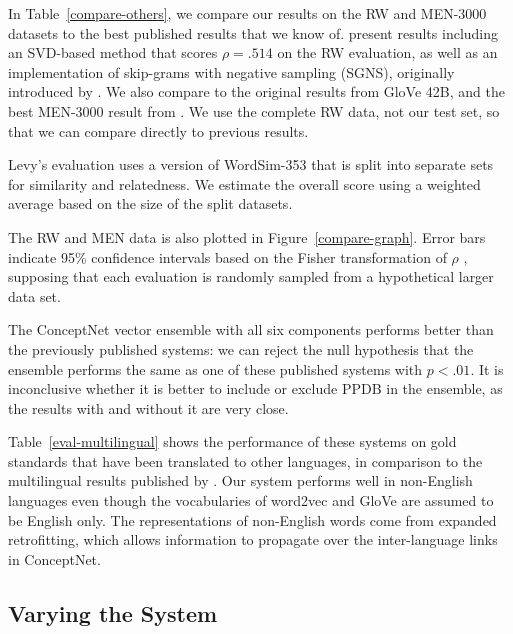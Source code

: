 \documentclass[11pt,letterpaper]{article}
\begin{document}
In Table~\ref{compare-others}, we compare our results on the RW and MEN-3000
datasets to the best published results that we know of.
 present results including an SVD-based method that
scores $\rho = .514$ on the RW evaluation, as well as an implementation of
skip-grams with negative sampling (SGNS), originally introduced by
. We also compare to the original results from
GloVe 42B, and the best MEN-3000 result from
. We use the complete RW data, not our test
set, so that we can compare directly to previous results.

Levy's evaluation uses a version of WordSim-353 that is split into separate
sets for similarity and relatedness. We estimate the overall score using a
weighted average based on the size of the split datasets.

The RW and MEN data is also plotted in Figure~\ref{compare-graph}. Error bars
indicate 95\% confidence intervals based on the Fisher transformation of $\rho$
\cite{fisher1915frequency}, supposing that each evaluation is randomly sampled
from a hypothetical larger data set.

The ConceptNet vector ensemble with all six components performs better than the
previously published systems: we can reject the null hypothesis that the
ensemble performs the same as one of these published systems with $p < .01$.
It is inconclusive whether it is better to include or exclude PPDB in the
ensemble, as the results with and without it are very close.

Table~\ref{eval-multilingual} shows the performance of these systems on
gold standards that have been translated to other languages, in comparison to
the multilingual results published by . Our
system performs well in non-English languages even though the vocabularies of
word2vec and GloVe are assumed to be English only. The representations of
non-English words come from expanded retrofitting, which allows information to
propagate over the inter-language links in ConceptNet.

\subsection{Varying the System}
\label{variations}
\end{document}
